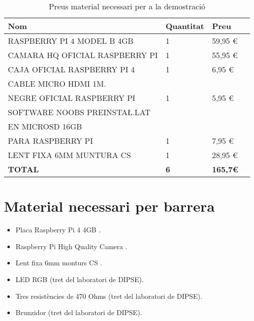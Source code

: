 
\begin{table}[H]
\centering
\begin{tabular}{llll}
\hline
    \textbf{Nom} & \textbf{Quantitat} & \textbf{Preu} \\ \hline
    RASPBERRY PI 4 MODEL B 4GB & 1 & 59,95 € \\ \hline
    CAMARA HQ OFICIAL RASPBERRY PI & 1 & 55,95 € \\ \hline
    CAJA OFICIAL RASPBERRY PI 4 & 1 & 6,95 € \\ \hline
    CABLE MICRO HDMI 1M. \\ NEGRE OFICIAL RASPBERRY PI & 1 & 5,95 € \\ \hline
    SOFTWARE NOOBS PREINSTA\L.LAT \\ EN MICROSD 16GB \\ PARA RASPBERRY PI & 1 & 7,95 € \\ \hline
    LENT FIXA 6MM MUNTURA CS & 1 & 28,95 € \\ \hline
    \textbf{TOTAL} & \textbf{6} & \textbf{165,7€} \\ \hline
\end{tabular}
\caption{Preus material necessari per a la demostració}
\label{tab:my-pressupost}
\end{table}

\section{Material necessari per barrera}

\begin{itemize}
    \item Placa Raspberry Pi 4 4GB \autocite{raspberry_Pi}.
    \item Raspberry Pi High Quality Camera \autocite{camera_rasp}.
    \item Lent fixa 6mm monturs CS \autocite{lent_rpi}.
    \item LED RGB (tret del laboratori de DIPSE).
    \item Tres resistències de 470 Ohms (tret del laboratori de DIPSE).
    \item Brunzidor (tret del laboratori de DIPSE).
\end{itemize}